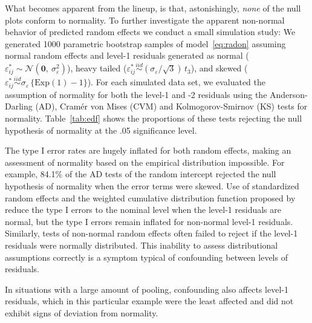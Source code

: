 \documentclass[12pt]{article} %
\begin{document}
What becomes apparent from the lineup, is that, astonishingly, {\it none} of the null plots conform to normality. To further investigate the apparent non-normal behavior of predicted random effects we conduct a small simulation study: 
%
We generated 1000 parametric bootstrap samples of model~\eqref{eq:radon} assuming normal random effects and level-1 residuals generated as normal ($\varepsilon_{ij}^* \sim \mathcal{N}(\bm{0},\ \sigma^2_\varepsilon)$), heavy tailed ($\varepsilon_{ij}^* \overset{iid}{\sim} (\sigma_{\varepsilon} / \sqrt{3})\, t_3$), and skewed ($\varepsilon_{ij}^* \overset{iid}{\sim} \sigma_{\varepsilon} \, \{ \text{Exp}(1) - 1 \}$).
For each simulated data set, we evaluated the assumption of normality for both the level-1 and -2 residuals using the Anderson-Darling (AD), Cram{\'e}r von Mises (CVM) and  Kolmogorov-Smirnov (KS) tests for normality.  
Table~\ref{tab:edf} shows the proportions of these tests rejecting the null hypothesis of normality at the .05 significance level. 

The type I error rates are hugely inflated for both random effects, making an assessment of normality based on the empirical distribution impossible. 
For example, 84.1\% of the AD tests of the random intercept rejected the null hypothesis of normality when the error terms were skewed.
 Use of standardized random effects and the weighted cumulative distribution function proposed by \cite{Lange:1989uu} reduce the type I errors to the nominal level when the level-1 residuals are normal, but the type I errors remain inflated for non-normal level-1 residuals. 
Similarly, tests of non-normal random effects often failed to reject if the level-1 residuals were normally distributed. 
This inability to assess distributional assumptions correctly is a symptom typical of confounding between levels of residuals.

In situations with a large amount of pooling, confounding also affects level-1 residuals, which in this particular example were the least affected and did not exhibit signs of deviation from normality.
\end{document}
